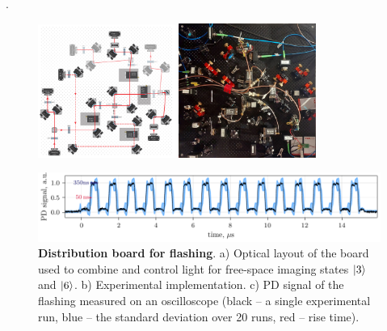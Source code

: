 .



\begin{figure}
    \centering
     \phantom{4}
    \includegraphics[width=0.4\textwidth]{fig-ai/flashing-distribution-scheme.pdf}
    \hspace{10 mm} 
     \phantom{4}
    \includegraphics[width=0.4\textwidth]{imgs/flashing-distribution-img.jpg}

    \includegraphics{fig-py/flashing-oscilloscope.pdf}

    \caption{
        \textbf{Distribution board for flashing}. 
        a) Optical layout of the board used to combine and control light for free-space imaging states $\left| 3 \right\rangle$ and $\left| 6 \right\rangle$.
        b) Experimental implementation.
        c) PD signal of the flashing measured on an oscilloscope (black -- a single experimental run, blue -- the standard deviation over 20 runs, red -- rise time).
    }
    \label{fig:flashing}
\end{figure}

